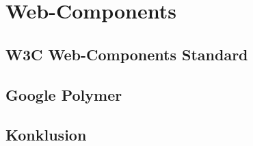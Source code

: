 \section{Web-Components}
\label{sec:3_Web_Components}



\subsection{W3C Web-Components Standard}
\label{sec:3_W3C}













\subsection{Google Polymer}
\label{sec:3_Polymer}



\subsection{Konklusion}
\label{sec:3_Konklusion}



